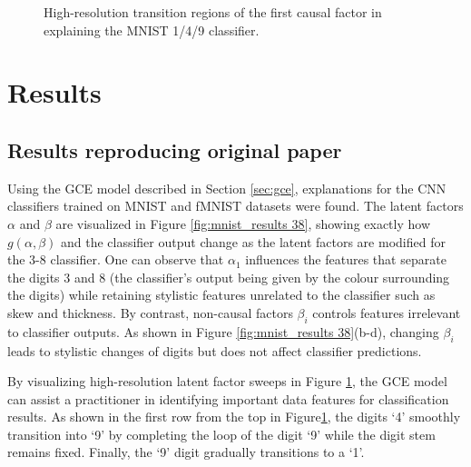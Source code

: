 
\begin{figure}[!htbp]
    \centering
    \caption{High-resolution transition regions of the first causal factor in explaining the MNIST 1/4/9 classifier.}
    \label{fig:high_resolution_149}
\end{figure}

\section{Results} \label{sec:results}
\subsection{Results reproducing original paper}

Using the GCE model described in Section \ref{sec:gce}, explanations for the CNN classifiers trained on MNIST and fMNIST datasets were found. The latent factors $\alpha$ and $\beta$ are visualized in Figure \ref{fig:mnist_results 38}, showing exactly how $g(\alpha, \beta)$ and the classifier output change as the latent factors are modified for the 3-8 classifier. One can observe that $\alpha_1$ influences the features that separate the digits 3 and 8 (the classifier's output being given by the colour surrounding the digits) while retaining stylistic features unrelated to the classifier such as skew and thickness. By contrast, non-causal factors ${\beta_i}$ controls features irrelevant to classifier outputs. As shown in Figure \ref{fig:mnist_results 38}(b-d), changing  ${\beta_i}$ leads to stylistic changes of digits but does not affect classifier predictions.

By visualizing high-resolution latent factor sweeps in Figure \ref{fig:high_resolution_149}, the GCE model can assist a practitioner in identifying important data features for classification results. As shown in the first row from the top in Figure\ref{fig:high_resolution_149}, the digits `4' smoothly transition into `9' by completing the loop of the digit `9’ while the digit stem remains fixed. Finally, the `9' digit gradually transitions to a `1'. 

